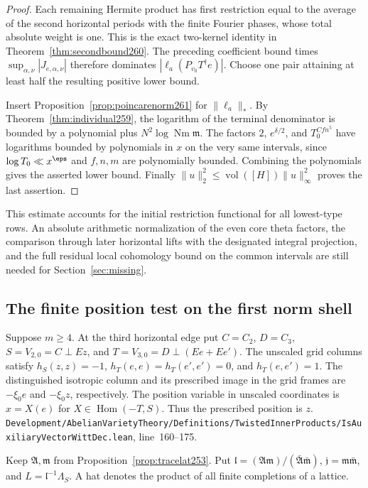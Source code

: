 \documentclass[a4paper,11pt]{article}
\theoremstyle{definition}
\theoremstyle{remark}
\newcommand{\srcloc}[2]{{\small\nolinkurl{#1.lean}}, line~#2}
\numberwithin{equation}{section}
\begin{document}
\begin{proof}
Each remaining Hermite product has first restriction equal to
the average of the second horizontal periods with the finite
Fourier phases, whose total absolute weight is one. This is
the exact two-kernel identity in Theorem~\ref{thm:secondbound260}.
The preceding coefficient bound times \(\sup_{\alpha,\nu}
|J_{e,\alpha,\nu}|\) therefore dominates
\(|\ell_a(P_{v_0}T^\dagger e)|\). Choose one pair attaining at
least half the resulting positive lower bound.

Insert Proposition~\ref{prop:poincarenorm261} for \(\|\ell_a\|_*\).
By Theorem~\ref{thm:individual259}, the logarithm of the
terminal denominator is bounded by a polynomial plus
\(N^2\log\operatorname{Nm}\mathfrak m\). The factors \(2\),
\(e^{\delta/2}\), and \(T_0^{Cfn^5}\) have logarithms bounded
by polynomials in \(x\) on the very same intervals, since
\(\log T_0\ll x^\eps\) and \(f,n,m\) are polynomially bounded.
Combining the polynomials gives the asserted lower bound.
Finally \(\|u\|_2^2\le\operatorname{vol}([H])\|u\|_\infty^2\)
proves the last assertion.
\end{proof}

This estimate accounts for the initial restriction functional
for all lowest-type rows. An absolute arithmetic normalization
of the even core theta factors, the comparison through later
horizontal lifts with the designated integral projection, and
the full residual local cohomology bound on the common intervals
are still needed for Section~\ref{sec:missing}.

\subsection{The finite position test on the first norm shell}\label{nav:II-51}
Suppose \(m\ge4\). At the third horizontal edge put \(C=C_2\),
\(D=C_3\), \(S=V_{2,0}=C\perp Ez\), and
\(T=V_{3,0}=D\perp(Ee+Ee')\). The unscaled grid columns satisfy
\(h_S(z,z)=-1\), \(h_T(e,e)=h_T(e',e')=0\), and
\(h_T(e,e')=1\). The distinguished isotropic column and its
prescribed image in the grid frames are \(-\xi_0e\) and
\(-\xi_0z\), respectively. The position variable in unscaled
coordinates is \(x=X(e)\) for \(X\in\operatorname{Hom}(-T,S)\).
Thus the prescribed position is \(z\).
\srcloc{Development/AbelianVarietyTheory/Definitions/TwistedInnerProducts/IsAuxiliaryVectorWittDec}{160--175}.

Keep \(\mathfrak A,\mathfrak m\) from
Proposition~\ref{prop:tracelat253}. Put
\(\mathfrak l=(\mathfrak A\mathfrak m)/
(\bar{\mathfrak A}\bar{\mathfrak m})\),
\(\mathfrak j=\mathfrak m\bar{\mathfrak m}\),
and \(L=\mathfrak l^{-1}\Lambda_S\). A hat denotes the
product of all finite completions of a lattice.
\end{document}
